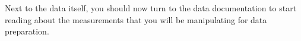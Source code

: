 Next to the data itself, you should now turn to the data documentation to start reading about the measurements that you will be manipulating for data preparation.%

%
%
%
%
%
%
%

%

%
%

\stopcontents[chapters]
